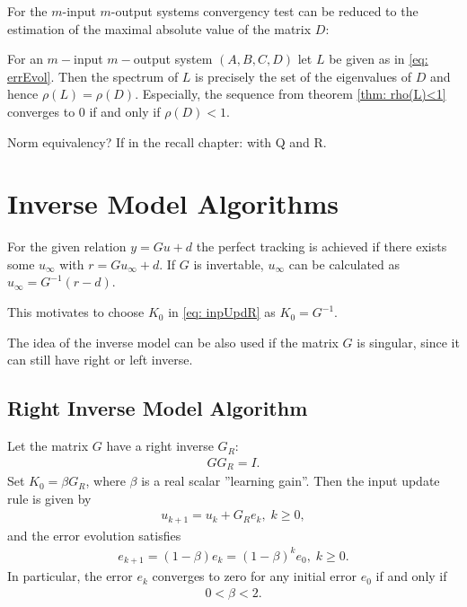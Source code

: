 For the $m$-input $m$-output systems convergency test can be reduced to the estimation of the maximal absolute value of the matrix $D$: 

\begin{theo}
    For an $m-$input $m-$output system $(A,B,C,D)$ let $L$ be given as in \eqref{eq: errEvol}. Then  the spectrum of $L$ is precisely the set of the eigenvalues of $D$ and hence $\rho(L) = \rho(D)$. Especially, the sequence from theorem \ref{thm: rho(L)<1} converges to 0 if and only if $\rho(D) < 1$. 
\end{theo}

\begin{theo}
	Norm equivalency? If in the recall chapter: with Q and R. 
\end{theo}

\section{Inverse Model Algorithms}
For the given relation $y = Gu + d$ the perfect tracking is achieved if there exists some $u_\infty$ with $r = G u_\infty + d$. If $G$ is invertable, $u_\infty$ can be calculated as $u_\infty = G^{-1}(r - d)$. 

This motivates to choose $K_0$ in \eqref{eq: inpUpdR} as $K_0 = G^{-1}$. 

The idea of the inverse model can be also used if the matrix $G$ is singular, since it can still have right or left inverse. 

\subsection{Right Inverse Model Algorithm}
\begin{alg}
	\label{alg: rightInv}
	Let the matrix $G$ have a right inverse $G_R$: 
	\begin{align*}
	G G_R = I. 
	\end{align*}
	Set $K_0 = \beta G_R$, where $\beta$ is a real scalar ''learning gain''. Then the input update rule is given by 
	\begin{align}
	u_{k+1} = u_k + G_R e_k, \; k\geq 0,
	\end{align} 
	and the error evolution satisfies 
	\begin{align}
	\label{eq: errRightInv}
	e_{k+1} = (1- \beta) e_k = (1-\beta)^k e_0, \; k\geq 0. 
	\end{align}
	In particular, the error $e_k$ converges to zero for any initial error $e_0$ if and only if 
	\begin{align*}
		0 < \beta < 2.
	\end{align*}
\end{alg}

